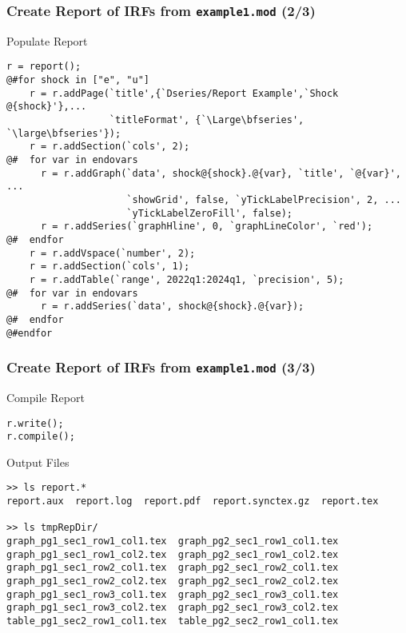 \documentclass[10pt]{beamer}
\begin{document}
\begin{frame}[fragile=singleslide,t]
  \frametitle{Create Report of IRFs from \texttt{example1.mod} (2/3)}
  \begin{block}{Populate Report}
\small{
\begin{verbatim}
r = report();
@#for shock in ["e", "u"]
    r = r.addPage(`title',{`Dseries/Report Example',`Shock @{shock}'},...
                  `titleFormat', {`\Large\bfseries', `\large\bfseries'});
    r = r.addSection(`cols', 2);
@#  for var in endovars
      r = r.addGraph(`data', shock@{shock}.@{var}, `title', `@{var}', ...
                     `showGrid', false, `yTickLabelPrecision', 2, ...
                     `yTickLabelZeroFill', false);
      r = r.addSeries(`graphHline', 0, `graphLineColor', `red');
@#  endfor
    r = r.addVspace(`number', 2);
    r = r.addSection(`cols', 1);
    r = r.addTable(`range', 2022q1:2024q1, `precision', 5);
@#  for var in endovars
      r = r.addSeries(`data', shock@{shock}.@{var});
@#  endfor
@#endfor
\end{verbatim}
}
  \end{block}
\end{frame}


\begin{frame}[fragile=singleslide,t]
  \frametitle{Create Report of IRFs from \texttt{example1.mod} (3/3)}
  \begin{block}{Compile Report}
\small{
\begin{verbatim}
r.write();
r.compile();
\end{verbatim}
}
  \end{block}
  \begin{block}{Output Files}
\small{
\begin{verbatim}
>> ls report.*
report.aux  report.log  report.pdf  report.synctex.gz  report.tex

>> ls tmpRepDir/
graph_pg1_sec1_row1_col1.tex  graph_pg2_sec1_row1_col1.tex
graph_pg1_sec1_row1_col2.tex  graph_pg2_sec1_row1_col2.tex
graph_pg1_sec1_row2_col1.tex  graph_pg2_sec1_row2_col1.tex
graph_pg1_sec1_row2_col2.tex  graph_pg2_sec1_row2_col2.tex
graph_pg1_sec1_row3_col1.tex  graph_pg2_sec1_row3_col1.tex
graph_pg1_sec1_row3_col2.tex  graph_pg2_sec1_row3_col2.tex
table_pg1_sec2_row1_col1.tex  table_pg2_sec2_row1_col1.tex
\end{verbatim}
}
  \end{block}
\end{frame}
\end{document}
